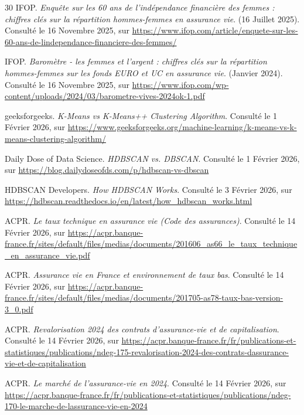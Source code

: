 \begin{thebibliography}{30}
IFOP. \textit{Enquête sur les 60 ans de l'indépendance financière des femmes : chiffres clés sur la répartition hommes-femmes en assurance vie}. (16 Juillet 2025). Consulté le 16 Novembre 2025, sur \url{https://www.ifop.com/article/enquete-sur-les-60-ans-de-lindependance-financiere-des-femmes/}

IFOP. \textit{Baromètre - les femmes et l'argent : chiffres clés sur la répartition hommes-femmes sur les fonds EURO et UC en assurance vie}. (Janvier 2024). Consulté le 16 Novembre 2025, sur \url{https://www.ifop.com/wp-content/uploads/2024/03/barometre-vives-2024ok-1.pdf}

geeksforgeeks. \textit{K-Means vs K-Means++ Clustering Algorithm}. Consulté le 1 Février 2026, sur \url{https://www.geeksforgeeks.org/machine-learning/k-means-vs-k-means-clustering-algorithm/}

Daily Dose of Data Science. \textit{HDBSCAN vs. DBSCAN}. Consulté le 1 Février 2026, sur \url{https://blog.dailydoseofds.com/p/hdbscan-vs-dbscan}

HDBSCAN Developers. \textit{How HDBSCAN Works}. Consulté le 3 Février 2026, sur \url{https://hdbscan.readthedocs.io/en/latest/how_hdbscan_works.html}


ACPR. \textit{Le taux technique en assurance vie (Code des assurances)}. Consulté le 14 Février 2026, sur \url{https://acpr.banque-france.fr/sites/default/files/medias/documents/201606_as66_le_taux_technique_en_assurance_vie.pdf}

ACPR. \textit{Assurance vie en France et environnement de taux bas}. Consulté le 14 Février 2026, sur \url{https://acpr.banque-france.fr/sites/default/files/medias/documents/201705-as78-taux-bas-version-3_0.pdf}

ACPR. \textit{Revalorisation 2024 des contrats d’assurance-vie et de capitalisation}. Consulté le 14 Février 2026, sur \url{https://acpr.banque-france.fr/fr/publications-et-statistiques/publications/ndeg-175-revalorisation-2024-des-contrats-dassurance-vie-et-de-capitalisation}

ACPR. \textit{Le marché de l’assurance-vie en 2024}. Consulté le 14 Février 2026, sur \url{https://acpr.banque-france.fr/fr/publications-et-statistiques/publications/ndeg-170-le-marche-de-lassurance-vie-en-2024}


\end{thebibliography}
